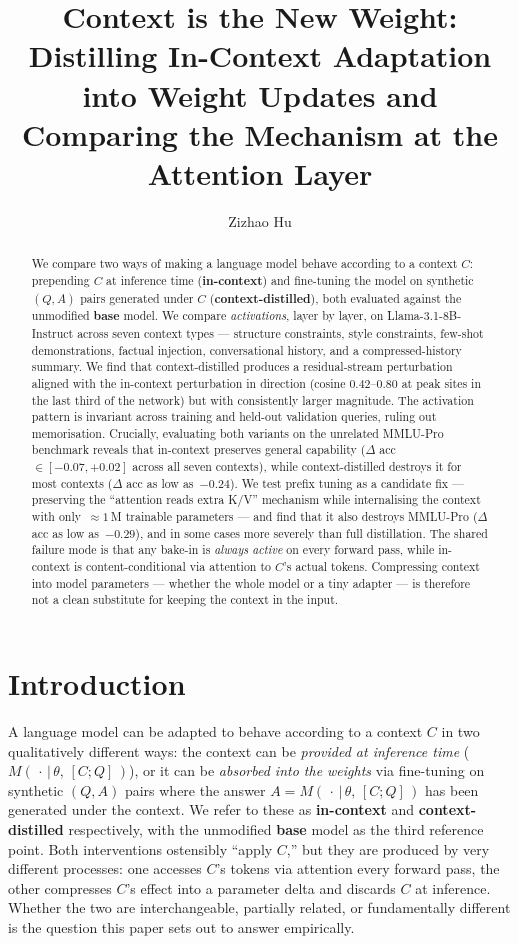 \documentclass[letterpaper]{article} %
\title{Context is the New Weight: Distilling In-Context Adaptation into Weight Updates and Comparing the Mechanism at the Attention Layer}
\author{
    Zizhao Hu
}
\begin{document}
\maketitle

\begin{abstract}
We compare two ways of making a language model behave according to a
context $C$: prepending $C$ at inference time (\textbf{in-context}) and
fine-tuning the model on synthetic $(Q, A)$ pairs generated under $C$
(\textbf{context-distilled}), both evaluated against the unmodified
\textbf{base} model. We compare \emph{activations}, layer by layer, on
Llama-3.1-8B-Instruct across seven context types --- structure
constraints, style constraints, few-shot demonstrations, factual
injection, conversational history, and a compressed-history summary. We
find that context-distilled produces a residual-stream perturbation
aligned with the in-context perturbation in direction (cosine
$0.42$--$0.80$ at peak sites in the last third of the network) but with
consistently larger magnitude. The activation pattern is invariant
across training and held-out validation queries, ruling out
memorisation. Crucially, evaluating both variants on the unrelated MMLU-Pro
benchmark reveals that in-context preserves general capability
($\Delta$ acc $\in [-0.07, +0.02]$ across all seven contexts), while
context-distilled destroys it for most contexts
($\Delta$ acc as low as~$-0.24$). We test prefix tuning as a candidate
fix --- preserving the ``attention reads extra K/V'' mechanism while
internalising the context with only~$\approx 1$\,M trainable
parameters --- and find that it also destroys MMLU-Pro
($\Delta$ acc as low as~$-0.29$), and in some cases more severely
than full distillation. The shared failure mode is that any bake-in
is \emph{always active} on every forward pass, while in-context is
content-conditional via attention to $C$'s actual tokens. Compressing
context into model parameters --- whether the whole model or a tiny
adapter --- is therefore not a clean substitute for keeping the
context in the input.
\end{abstract}

\section{Introduction}
\label{sec:intro}

A language model can be adapted to behave according to a context $C$ in
two qualitatively different ways: the context can be \emph{provided at
inference time} ($M(\,\cdot\,|\,\theta,\, [C; Q]\,)$), or it can be
\emph{absorbed into the weights} via fine-tuning on synthetic $(Q, A)$
pairs where the answer $A = M(\,\cdot\,|\,\theta,\, [C; Q]\,)$ has been
generated under the context. We refer to these as \textbf{in-context}
and \textbf{context-distilled} respectively, with the unmodified
\textbf{base} model as the third reference point. Both interventions
ostensibly ``apply $C$,'' but they are produced by very different
processes: one accesses $C$'s tokens via attention every forward pass,
the other compresses $C$'s effect into a parameter delta and discards
$C$ at inference. Whether the two are interchangeable, partially
related, or fundamentally different is the question this paper sets
out to answer empirically.
\end{document}
